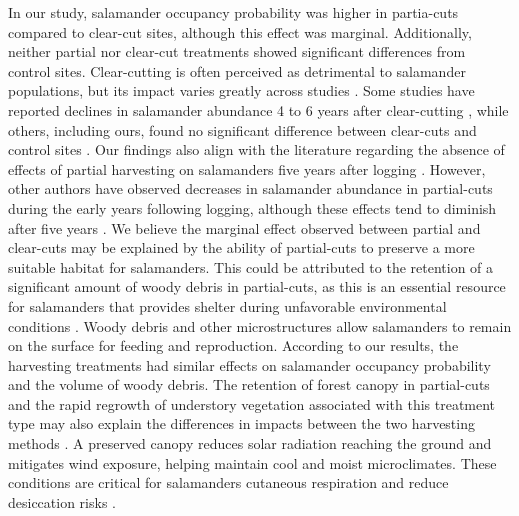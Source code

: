 In our study, salamander occupancy probability was higher in partia-cuts compared to clear-cut sites, although this effect was marginal. Additionally, neither partial nor clear-cut treatments showed significant differences from control sites. 
Clear-cutting is often perceived as detrimental to salamander populations, but its impact varies greatly across studies \citep{Hocking2013Effectsexperimental,Chaudhary2016Impactforest}. 
Some studies have reported declines in salamander abundance 4 to 6 years after clear-cutting \citep{Petranka1993Effectstimber,Herbeck1999PlethodontidSalamander,Grialou2000effectsforest,Macneil2014Effectstimber},  
while others, including ours, found no significant difference between clear-cuts and control sites \citep{Renken2004EffectsForest,Mazerolle2021Woodlandsalamander}. 
Our findings also align with the literature regarding the absence of effects of partial harvesting on salamanders five years after logging \citep{McKenny2006Effectsstructural,Mazerolle2021Woodlandsalamander,Ochs2022Responseterrestrial}. 
However, other authors have observed decreases in salamander abundance in partial-cuts during the early years following logging, although these effects tend to diminish after five years \citep{Harpole1999Effectsseven,Knapp2003Initialeffects,Morneault2004effectshelterwood}.  
We believe the marginal effect observed between partial and clear-cuts may be explained by the ability of partial-cuts to preserve a more suitable habitat for salamanders. 
This could be attributed to the retention of a significant amount of woody debris in partial-cuts, as this is an essential resource for salamanders that provides shelter during unfavorable environmental conditions \citep{Nolet2018Comparingeffects,Peterman2014Spatialvariation,Achat2015Quantifyingconsequences,Peele2017Effectswoody}.  
Woody debris and other microstructures allow salamanders to remain on the surface for feeding and reproduction. 
According to our results, the harvesting treatments had similar effects on salamander occupancy probability and the volume of woody debris. 
The retention of forest canopy in partial-cuts and the rapid regrowth of understory vegetation associated with this treatment type may also explain the differences in impacts between the two harvesting methods \citep{Raybuck2015silviculturalpractices}. 
A preserved canopy reduces solar radiation reaching the ground and mitigates wind exposure, helping maintain cool and moist microclimates. 
These conditions are critical for salamanders cutaneous respiration and reduce desiccation risks \citep{Homyack2011Energeticssurface}. 
